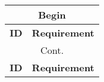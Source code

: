\begin{center}
\begin{longtable}{|c|>{\raggedright\arraybackslash}m{15cm}|}

    \hline
    \multicolumn{2}{|c|}{Begin}\\\hline
    \textbf{ID} & \textbf{Requirement}\\\hline
    \endfirsthead
    
    \hline
    \multicolumn{2}{|c|}{Cont.}\\\hline
    \textbf{ID} & \textbf{Requirement}\\\hline
    \endhead 
 

\end{longtable}
\end{center}
